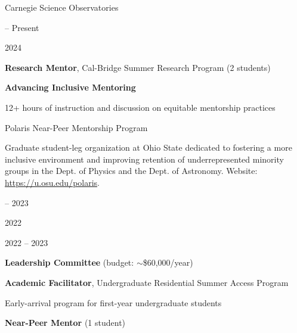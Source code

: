 \documentclass[cv.tex]{subfiles}
\begin{document}
{\color{themecolor} \large Carnegie Science Observatories}
\par\noindent
\parbox{0.18\textwidth}{%
	 -- Present \par
	2024 \par
	\null \par
}
\hspace{1mm}
\parbox{0.8\textwidth}{%
	\textbf{Research Mentor}, Cal-Bridge Summer Research Program (2 students)
	\par
	\textbf{Advancing Inclusive Mentoring} \par
	12+ hours of instruction and discussion on equitable mentorship practices
	\par
}

\vspace{5mm}
\noindent
{\color{themecolor} \large Polaris Near-Peer Mentorship Program}
\par\noindent
Graduate student-leg organization at Ohio State dedicated to fostering a more
inclusive environment and improving retention of underrepresented minority
groups in the Dept. of Physics and the Dept. of Astronomy.
Website: \url{https://u.osu.edu/polaris}.
\par\noindent
\parbox{0.18\textwidth}{%
	 -- 2023 \par
	2022 \par
	\null \par
	2022 -- 2023 \par
}
\hspace{1mm}
\parbox{0.8\textwidth}{%
	\textbf{Leadership Committee} (budget: $\sim$\$60,000/year) \par
	\textbf{Academic Facilitator}, Undergraduate Residential Summer Access
	Program \par
	Early-arrival program for first-year undergraduate students \par
	\textbf{Near-Peer Mentor} (1 student) \par
}
\end{document}
